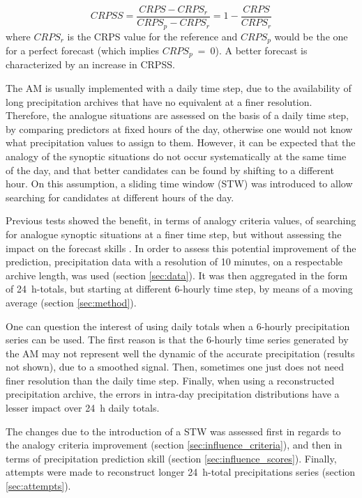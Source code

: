 \documentclass[hess]{copernicus}
\begin{document}
\begin{equation}
\label{eq:CRPSS}
CRPSS = \frac{CRPS-CRPS_{r}}{CRPS_{p}-CRPS_{r}} = 1-\frac{CRPS}{CRPS_{r}}
\end{equation}
where $CRPS_{r}$ is the CRPS value for the reference and $CRPS_{p}$ would be the one for a perfect forecast (which implies $CRPS_{p}~=~0$). A better forecast is characterized by an increase in CRPSS. 

The AM is usually implemented with a daily time step, due to the availability of long precipitation archives that have no equivalent at a finer resolution. Therefore, the analogue situations are assessed on the basis of a daily time step, by comparing predictors at fixed hours of the day, otherwise one would not know what precipitation values to assign to them. However, it can be expected that the analogy of the synoptic situations do not occur systematically at the same time of the day, and that better candidates can be found by shifting to a different hour. On this assumption, a sliding time window (STW) was introduced to allow searching for candidates at different hours of the day.

Previous tests showed the benefit, in terms of analogy criteria values, of searching for analogue synoptic situations at a finer time step, but without assessing the impact on the forecast skills \citep{Finet2008}. In order to assess this potential improvement of the prediction, precipitation data with a resolution of 10 minutes, on a respectable archive length, was used (section \ref{sec:data}). It was then aggregated in the form of 24~h-totals, but starting at different 6-hourly time step, by means of a moving average (section \ref{sec:method}). 

One can question the interest of using daily totals when a 6-hourly precipitation series can be used. The first reason is that the 6-hourly time series generated by the AM may not represent well the dynamic of the accurate precipitation (results not shown), due to a smoothed signal. Then, sometimes one just does not need finer resolution than the daily time step. Finally, when using a reconstructed precipitation archive, the errors in intra-day precipitation distributions have a lesser impact over 24~h daily totals.

The changes due to the introduction of a STW was assessed first in regards to the analogy criteria improvement (section \ref{sec:influence_criteria}), and then in terms of precipitation prediction skill (section \ref{sec:influence_scores}). Finally, attempts were made to reconstruct longer 24~h-total precipitations series (section \ref{sec:attempts}).
\end{document}
